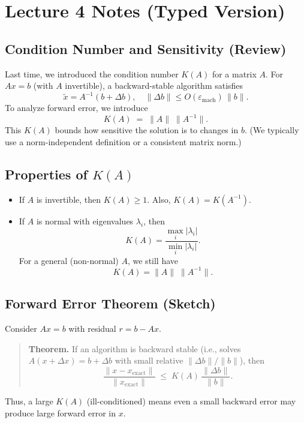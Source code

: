 \section{Lecture 4 Notes (Typed Version)}

\subsection*{Condition Number and Sensitivity (Review)}

Last time, we introduced the condition number $K(A)$ for a matrix $A$. For $Ax = b$ (with $A$ invertible), a backward-stable algorithm satisfies
\[
\widetilde{x} = A^{-1}(b + \Delta b),
\quad
\|\Delta b\| \le O(\varepsilon_{\mathrm{mach}})\,\|b\|.
\]
To analyze forward error, we introduce
\[
K(A) \;=\; \|A\|\;\|A^{-1}\|.
\]
This $K(A)$ bounds how sensitive the solution is to changes in $b$. (We typically use a norm-independent definition or a consistent matrix norm.)

\subsection*{Properties of \texorpdfstring{$K(A)$}{K(A)}}

\begin{itemize}
    \item If $A$ is invertible, then $K(A) \ge 1$. Also, $K(A) = K(A^{-1})$.
    \item If $A$ is normal with eigenvalues $\lambda_i$, then
          \[
          K(A) = \frac{\max_i |\lambda_i|}{\min_i |\lambda_i|}.
          \]
          For a general (non-normal) $A$, we still have
          \[
          K(A) = \|A\|\;\|A^{-1}\|.
          \]
\end{itemize}

\subsection*{Forward Error Theorem (Sketch)}

Consider $Ax = b$ with residual $r = b - A x$.

\begin{quote}
\textbf{Theorem.}  
If an algorithm is backward stable (i.e., solves $A(x + \Delta x) = b + \Delta b$ with small relative $\|\Delta b\|/\|b\|$), then
\[
\frac{\|x - x_{\mathrm{exact}}\|}{\|x_{\mathrm{exact}}\|} 
\;\le\; K(A)\,\frac{\|\Delta b\|}{\|b\|}.
\]
\end{quote}

Thus, a large $K(A)$ (ill-conditioned) means even a small backward error may produce large forward error in $x$.

